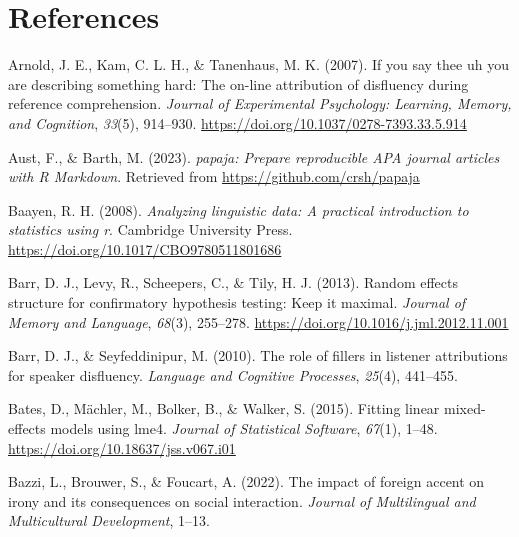 \documentclass[
  man,floatsintext]{apa7}
\newlength{\cslhangindent}
\newlength{\cslentryspacingunit} %
\newenvironment{CSLReferences}[2] %
 {%
  \setlength{\parindent}{0pt}
  \ifodd #1
  \let\oldpar\par
  \def\par{\hangindent=\cslhangindent\oldpar}
  \fi
  \setlength{\parskip}{#2\cslentryspacingunit}
 }%
 {}
\begin{document}
\newpage

\hypertarget{references}{%
\section{References}\label{references}}

\hypertarget{refs}{}
\begin{CSLReferences}{1}{0}
\leavevmode{}%
Arnold, J. E., Kam, C. L. H., \& Tanenhaus, M. K. (2007). If you say thee uh you are describing something hard: The on-line attribution of disfluency during reference comprehension. \emph{Journal of Experimental Psychology: Learning, Memory, and Cognition}, \emph{33}(5), 914--930. \url{https://doi.org/10.1037/0278-7393.33.5.914}

\leavevmode{}%
Aust, F., \& Barth, M. (2023). \emph{{papaja}: {Prepare} reproducible {APA} journal articles with {R Markdown}}. Retrieved from \url{https://github.com/crsh/papaja}

\leavevmode{}%
Baayen, R. H. (2008). \emph{Analyzing linguistic data: A practical introduction to statistics using r}. Cambridge University Press. \url{https://doi.org/10.1017/CBO9780511801686}

\leavevmode{}%
Barr, D. J., Levy, R., Scheepers, C., \& Tily, H. J. (2013). Random effects structure for confirmatory hypothesis testing: Keep it maximal. \emph{Journal of Memory and Language}, \emph{68}(3), 255--278. \url{https://doi.org/10.1016/j.jml.2012.11.001}

\leavevmode{}%
Barr, D. J., \& Seyfeddinipur, M. (2010). The role of fillers in listener attributions for speaker disfluency. \emph{Language and Cognitive Processes}, \emph{25}(4), 441--455.

\leavevmode{}%
Bates, D., Mächler, M., Bolker, B., \& Walker, S. (2015). Fitting linear mixed-effects models using {lme4}. \emph{Journal of Statistical Software}, \emph{67}(1), 1--48. \url{https://doi.org/10.18637/jss.v067.i01}

\leavevmode{}%
Bazzi, L., Brouwer, S., \& Foucart, A. (2022). The impact of foreign accent on irony and its consequences on social interaction. \emph{Journal of Multilingual and Multicultural Development}, 1--13.


\end{CSLReferences}
\end{document}
